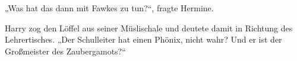 „Was hat das dann mit Fawkes zu tun?“, fragte Hermine.

Harry zog den Löffel aus seiner Müslischale und deutete damit in Richtung des Lehrertisches.
„Der Schulleiter hat einen Phönix, nicht wahr? Und er ist der Großmeister des Zaubergamots?“
